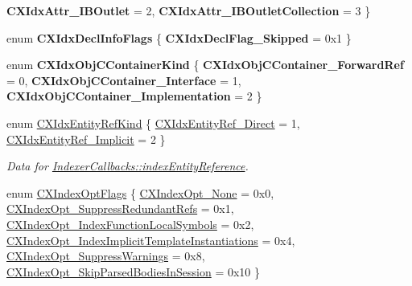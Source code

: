 \begin{DoxyCompactItemize}
{\bfseries C\+X\+Idx\+Attr\+\_\+\+I\+B\+Outlet} = 2, 
{\bfseries C\+X\+Idx\+Attr\+\_\+\+I\+B\+Outlet\+Collection} = 3
 \}
\item 
\mbox{\label{group__CINDEX__HIGH_gac2ab581a399019383ada51a95ad4661c}} 
enum {\bfseries C\+X\+Idx\+Decl\+Info\+Flags} \{ {\bfseries C\+X\+Idx\+Decl\+Flag\+\_\+\+Skipped} = 0x1
 \}
\item 
\mbox{\label{group__CINDEX__HIGH_ga3a7b134403ae721de4bb61dbaa35ece0}} 
enum {\bfseries C\+X\+Idx\+Obj\+C\+Container\+Kind} \{ {\bfseries C\+X\+Idx\+Obj\+C\+Container\+\_\+\+Forward\+Ref} = 0, 
{\bfseries C\+X\+Idx\+Obj\+C\+Container\+\_\+\+Interface} = 1, 
{\bfseries C\+X\+Idx\+Obj\+C\+Container\+\_\+\+Implementation} = 2
 \}
\item 
enum \mbox{\hyperlink{group__CINDEX__HIGH_ga4158d96205b540d3ef4992cf6689c2aa}{C\+X\+Idx\+Entity\+Ref\+Kind}} \{ \mbox{\hyperlink{group__CINDEX__HIGH_gga4158d96205b540d3ef4992cf6689c2aaa480bab642d15b16ba1156566979b8a4c}{C\+X\+Idx\+Entity\+Ref\+\_\+\+Direct}} = 1, 
\mbox{\hyperlink{group__CINDEX__HIGH_gga4158d96205b540d3ef4992cf6689c2aaa275d2671931e7a53f86372da524b5d61}{C\+X\+Idx\+Entity\+Ref\+\_\+\+Implicit}} = 2
 \}
\begin{DoxyCompactList}\small\item\em Data for \mbox{\hyperlink{structIndexerCallbacks_a6d93809e7743a590beafa0387ac145dc}{Indexer\+Callbacks\+::index\+Entity\+Reference}}. \end{DoxyCompactList}\item 
enum \mbox{\hyperlink{group__CINDEX__HIGH_ga8c30458ffd9b99a7fcd95a5759c99816}{C\+X\+Index\+Opt\+Flags}} \{ \newline
\mbox{\hyperlink{group__CINDEX__HIGH_gga8c30458ffd9b99a7fcd95a5759c99816a1f75207a1b25c860d647ffdfab0fa4c9}{C\+X\+Index\+Opt\+\_\+\+None}} = 0x0, 
\mbox{\hyperlink{group__CINDEX__HIGH_gga8c30458ffd9b99a7fcd95a5759c99816a3d5d796739d08fa05d257421d822a87c}{C\+X\+Index\+Opt\+\_\+\+Suppress\+Redundant\+Refs}} = 0x1, 
\mbox{\hyperlink{group__CINDEX__HIGH_gga8c30458ffd9b99a7fcd95a5759c99816adb72ccbaf307a330f661e8d9918a5c9c}{C\+X\+Index\+Opt\+\_\+\+Index\+Function\+Local\+Symbols}} = 0x2, 
\mbox{\hyperlink{group__CINDEX__HIGH_gga8c30458ffd9b99a7fcd95a5759c99816ad1a2aba8a113667f69dfc84a852b026e}{C\+X\+Index\+Opt\+\_\+\+Index\+Implicit\+Template\+Instantiations}} = 0x4, 
\newline
\mbox{\hyperlink{group__CINDEX__HIGH_gga8c30458ffd9b99a7fcd95a5759c99816a827daacd70e8610538f7fa0fee0897ff}{C\+X\+Index\+Opt\+\_\+\+Suppress\+Warnings}} = 0x8, 
\mbox{\hyperlink{group__CINDEX__HIGH_gga8c30458ffd9b99a7fcd95a5759c99816a2c92f2b0443ba766fc00a9d6bb2f25aa}{C\+X\+Index\+Opt\+\_\+\+Skip\+Parsed\+Bodies\+In\+Session}} = 0x10
 \}
\end{DoxyCompactItemize}
